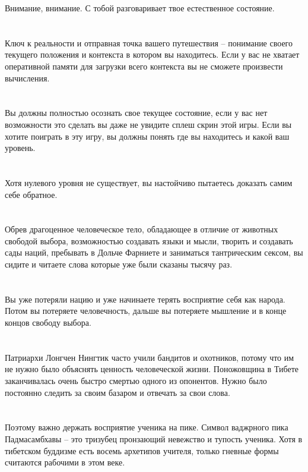 Внимание, внимание. С тобой разговаривает твое естественное состояние.\\
\\
\\
Ключ к реальности и отправная точка вашего путешествия -- понимание своего текущего положения и контекста в котором вы находитесь. Если у вас не хватает оперативной памяти для загрузки всего контекста вы не сможете произвести вычисления.\\
\\
\\
Вы должны полностью осознать свое текущее состояние, если у вас нет возможности это сделать вы даже не увидите сплеш скрин этой игры. Если вы хотите поиграть в эту игру, вы должны понять где вы находитесь и какой ваш уровень.\\
\\
\\
Хотя нулевого уровня не существует, вы настойчиво пытаетесь доказать самим себе обратное.\\
\\
\\
Обрев драгоценное человеческое тело, обладающее в отличие от животных свободой выбора, возможностью создавать языки и мысли, творить и создавать сады наций, пребывать в Дольче Фарниете и заниматься тантрическим сексом, вы сидите и читаете слова которые уже были сказаны тысячу раз.\\
\\
\\
Вы уже потеряли нацию и уже начинаете терять восприятие себя как народа. Потом вы потеряете человечность, дальше вы потеряете мышление и в конце концов свободу выбора.\\
\\
\\
Патриархи Лонгчен Нингтик часто учили бандитов и охотников, потому что им не нужно было объяснять ценность человеческой жизни. Поножовщина в Тибете заканчивалась очень быстро смертью одного из опонентов. Нужно было постоянно следить за своим базаром и отвечать за свои слова.\\
\\
\\
Поэтому важно держать восприятие ученика на пике. Символ ваджрного пика Падмасамбхавы -- это тризубец пронзающий невежство и тупость ученика. Хотя в тибетском буддизме есть восемь архетипов учителя, только гневные формы считаются рабочими в этом веке.\\
\\
\\
